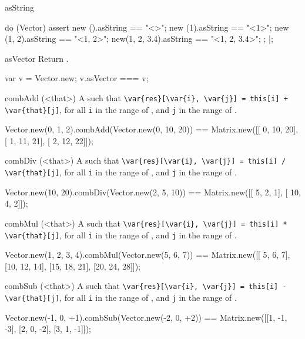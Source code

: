 \begin{urbiscriptapi}
\item[asString]%
\begin{urbiscript}
do (Vector)
{
  assert
  {
    new         ().asString == "<>";
    new        (1).asString == "<1>";
    new     (1, 2).asString == "<1, 2>";
    new(1, 2, 3.4).asString == "<1, 2, 3.4>";
  };
}|;
\end{urbiscript}

\item[asVector]%
  Return \this.
\begin{urbiassert}
var v = Vector.new;
v.asVector === v;
\end{urbiassert}

\item[combAdd](<that>)%
  A   such that
  \lstinline|\var{res}[\var{i}, \var{j}] = this[i] + \var{that}[j]|, for all
  \lstinline|i| in the range of \this, and \lstinline|j| in the range of
  \that.
\begin{urbiassert}
Vector.new(0, 1, 2).combAdd(Vector.new(0, 10, 20))
  == Matrix.new([[ 0, 10, 20],
                 [ 1, 11, 21],
                 [ 2, 12, 22]]);
\end{urbiassert}

\item[combDiv](<that>)%
  A   such that
  \lstinline|\var{res}[\var{i}, \var{j}] = this[i] / \var{that}[j]|, for all
  \lstinline|i| in the range of \this, and \lstinline|j| in the range of
  \that.
\begin{urbiassert}
Vector.new(10, 20).combDiv(Vector.new(2, 5, 10))
  == Matrix.new([[  5, 2, 1],
                 [ 10, 4, 2]]);
\end{urbiassert}

\item[combMul](<that>)%
  A   such that
  \lstinline|\var{res}[\var{i}, \var{j}] = this[i] * \var{that}[j]|, for all
  \lstinline|i| in the range of \this, and \lstinline|j| in the range of
  \that.
\begin{urbiassert}
Vector.new(1, 2, 3, 4).combMul(Vector.new(5, 6, 7))
  == Matrix.new([[ 5,  6,  7],
                 [10, 12, 14],
                 [15, 18, 21],
                 [20, 24, 28]]);
\end{urbiassert}

\item[combSub](<that>)%
  A   such that
  \lstinline|\var{res}[\var{i}, \var{j}] = this[i] - \var{that}[j]|, for all
  \lstinline|i| in the range of \this, and \lstinline|j| in the range of
  \that.
\begin{urbiassert}
Vector.new(-1, 0, +1).combSub(Vector.new(-2, 0, +2))
  == Matrix.new([[1, -1, -3],
                 [2,  0, -2],
                 [3,  1, -1]]);
\end{urbiassert}


\end{urbiscriptapi}
